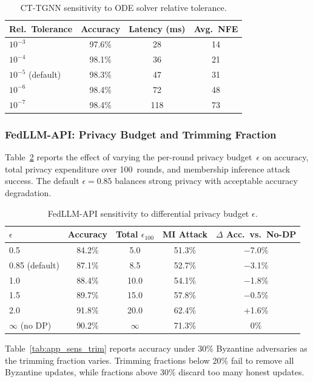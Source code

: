 \begin{table}[htbp]
\centering
\caption{CT-TGNN sensitivity to ODE solver relative tolerance.}
\label{tab:app_sens_tol}
\begin{tabular}{lccc}
\toprule
Rel.\ Tolerance & Accuracy & Latency (ms) & Avg.\ NFE \\
\midrule
$10^{-3}$ & 97.6\% & 28 & 14 \\
$10^{-4}$ & 98.1\% & 36 & 21 \\
$10^{-5}$ (default) & 98.3\% & 47 & 31 \\
$10^{-6}$ & 98.4\% & 72 & 48 \\
$10^{-7}$ & 98.4\% & 118 & 73 \\
\bottomrule
\end{tabular}
\end{table}


\subsubsection{FedLLM-API: Privacy Budget and Trimming Fraction}

Table~\ref{tab:app_sens_dp} reports the effect of varying the per-round privacy budget~$\epsilon$ on accuracy, total privacy expenditure over 100~rounds, and membership inference attack success. The default $\epsilon=0.85$ balances strong privacy with acceptable accuracy degradation.

\begin{table}[htbp]
\centering
\caption{FedLLM-API sensitivity to differential privacy budget $\epsilon$.}
\label{tab:app_sens_dp}
\begin{tabular}{lcccc}
\toprule
$\epsilon$ & Accuracy & Total $\epsilon_{100}$ & MI Attack & $\Delta$ Acc.\ vs.\ No-DP \\
\midrule
0.5  & 84.2\% & 5.0  & 51.3\% & $-$7.0\% \\
0.85 (default) & 87.1\% & 8.5  & 52.7\% & $-$3.1\% \\
1.0  & 88.4\% & 10.0 & 54.1\% & $-$1.8\% \\
1.5  & 89.7\% & 15.0 & 57.8\% & $-$0.5\% \\
2.0  & 91.8\% & 20.0 & 62.4\% & +1.6\% \\
$\infty$ (no DP) & 90.2\% & $\infty$ & 71.3\% & 0\% \\
\bottomrule
\end{tabular}
\end{table}

Table~\ref{tab:app_sens_trim} reports accuracy under 30\% Byzantine adversaries as the trimming fraction varies. Trimming fractions below 20\% fail to remove all Byzantine updates, while fractions above 30\% discard too many honest updates.

